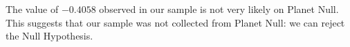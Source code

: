 \begin{example}
\begin{knitrout}
\end{knitrout}

The value of $-0.4058$ observed in our sample is not very likely on
Planet Null.  This suggests that our sample was not collected from
Planet Null: we can reject the Null Hypothesis.


\end{example}

